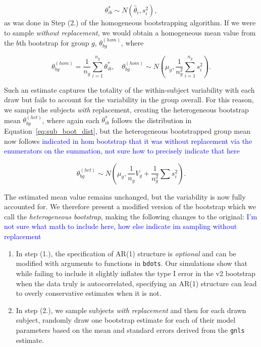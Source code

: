 \documentclass{article}
\newcommand{\xt}{\texttt}
\providecommand{\cn}[1]{\textcolor{blue}{#1}}
\begin{document}
\begin{equation}\label{eq:sub_boot_dist}
\theta^*_{ib} \sim N(\hat{\theta}_i, s_i^2),
\end{equation}
as was done in Step (2.) of the homogeneous bootstrapping algorithm. If we were to sample \textit{without replacement}, we would obtain a homogeneous mean value from the $b$th bootstrap for group $g$, $\theta^{(hom)}_{bg}$, where

\begin{equation}\label{eq:wo_rep_boot}
\theta^{(hom)}_{bg} = \frac{1}{n_g} \sum_{i=1}^{n_g} \theta^{*}_{ib}, \quad \theta^{(hom)}_{bg} \sim N \left( \mu_{g}, \frac{1}{n_g^2} \sum_{i=1}^{n_g} s_i^2 \right).
\end{equation}

Such an estimate captures the totality of the within-subject variability with each draw but fails to account for the variability in the group overall. For this reason, we sample the subjects \textit{with} replacement, creating the heterogeneous bootstrap mean $\theta_{bg}^{(het)}$, where again each $\theta_{ib}^*$ follows the distribution in Equation~\ref{eq:sub_boot_dist}, but the heterogeneous bootstrapped group mean now follows \cn{indicated in hom bootstrap that it was without replacement via the enumerators on the summation, not sure how to precisely indicate that here}

\begin{equation}\label{eq:w_rep_boot}
\theta_{bg}^{(het)} \sim N \left( \mu_{g}, \frac{1}{n_g} V_{g} + \frac{1}{n_g^2} \sum s_i^2 \right).
\end{equation}

The estimated mean value remains unchanged, but the variability is now fully accounted for. We therefore present a modified version of the bootstrap which we call the \textit{heterogeneous bootstrap}, making the following changes to the original:  \cn{I'm not sure what math to include here, how else indicate im sampling without replacement}

\begin{enumerate}
\item In step (1.), the specification of AR(1) structure is \textit{optional} and can be modified with arguments to functions in \xt{bdots}. Our simulations show that while failing to include it slightly inflates the type I error in the v2 bootstrap when the data truly is autocorrelated, specifying an AR(1) structure can lead to overly conservative estimates when it is not.
\item In step (2.), we sample subjects \textit{with replacement} and then for each drawn subject, randomly draw one bootstrap estimate for each of their model parameters based on the mean and standard errors derived from the \xt{gnls} estimate.
\end{enumerate}
\end{document}
